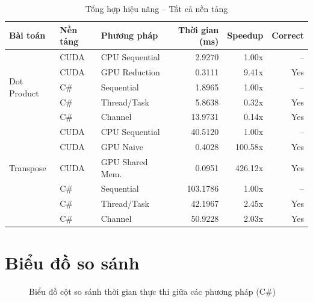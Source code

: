 \documentclass[12pt,a4paper]{article}
\begin{document}
\begin{table}[H]
\centering
\caption{Tổng hợp hiệu năng -- Tất cả nền tảng}
\begin{tabular}{lllrrr}
\toprule
\textbf{Bài toán} & \textbf{Nền tảng} & \textbf{Phương pháp} & \textbf{Thời gian (ms)} & \textbf{Speedup} & \textbf{Correct} \\
\midrule
\multirow{5}{*}{Dot Product}
  & CUDA & CPU Sequential  & 2.9270  & 1.00x & -- \\
  & CUDA & GPU Reduction   & 0.3111  & 9.41x & Yes \\
  & C\#  & Sequential      & 1.8965  & 1.00x & -- \\
  & C\#  & Thread/Task     & 5.8638  & 0.32x & Yes \\
  & C\#  & Channel         & 13.9731 & 0.14x & Yes \\
\midrule
\multirow{5}{*}{Transpose}
  & CUDA & CPU Sequential  & 40.5120 & 1.00x & -- \\
  & CUDA & GPU Naive       & 0.4028  & 100.58x & Yes \\
  & CUDA & GPU Shared Mem. & 0.0951  & 426.12x & Yes \\
  & C\#  & Sequential      & 103.1786 & 1.00x & -- \\
  & C\#  & Thread/Task     & 42.1967  & 2.45x & Yes \\
  & C\#  & Channel         & 50.9228  & 2.03x & Yes \\
\bottomrule
\end{tabular}
\end{table}

\section{Biểu đồ so sánh}

\begin{figure}[H]
\centering
{}
\caption{Biểu đồ cột so sánh thời gian thực thi giữa các phương pháp (C\#)}
\end{figure}
\end{document}
